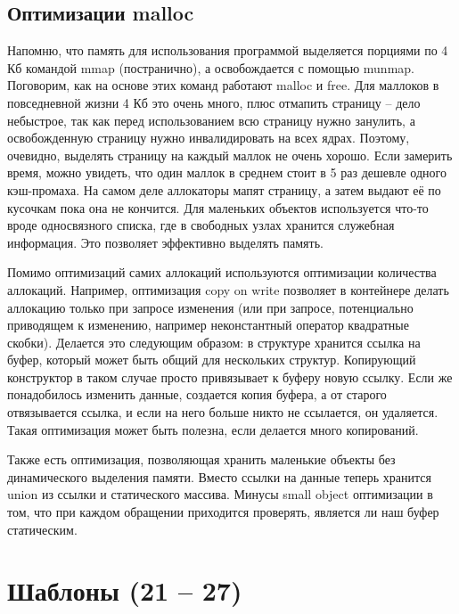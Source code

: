 \documentclass[12pt, a4paper]{article}
\begin{document}
	\subsection{Оптимизации malloc}
	Напомню, что память для использования программой выделяется порциями по 4 Кб командой mmap (постранично), а освобождается с помощью munmap. Поговорим, как на основе этих команд работают malloc и free. Для маллоков в повседневной жизни 4 Кб это очень много, плюс отмапить страницу -- дело небыстрое, так как перед использованием всю страницу нужно занулить, а освобожденную страницу нужно инвалидировать на всех ядрах. Поэтому, очевидно, выделять страницу на каждый маллок не очень хорошо. Если замерить время, можно увидеть, что один маллок в среднем стоит в 5 раз дешевле одного кэш-промаха. На самом деле аллокаторы мапят страницу, а затем выдают её по кусочкам пока она не кончится. Для маленьких объектов используется что-то вроде односвязного списка, где в свободных узлах хранится служебная информация. Это позволяет эффективно выделять память.
	\\\par Помимо оптимизаций самих аллокаций используются оптимизации количества аллокаций. Например, оптимизация copy on write позволяет в контейнере делать аллокацию только при запросе изменения (или при запросе, потенциально приводящем к изменению, например неконстантный оператор квадратные скобки). Делается это следующим образом: в структуре хранится ссылка на буфер, который может быть общий для нескольких структур. Копирующий конструктор в таком случае просто привязывает к буферу новую ссылку. Если же понадобилось изменить данные, создается копия буфера, а от старого отвязывается ссылка, и если на него больше никто не ссылается, он удаляется. Такая оптимизация может быть полезна, если делается много копирований.
	\par Также есть оптимизация, позволяющая хранить маленькие объекты без динамического выделения памяти. Вместо ссылки на данные теперь хранится union из ссылки и статического массива. Минусы small object оптимизации в том, что при каждом обращении приходится проверять, является ли наш буфер статическим.
	\section{Шаблоны (21 -- 27)}
\end{document}
